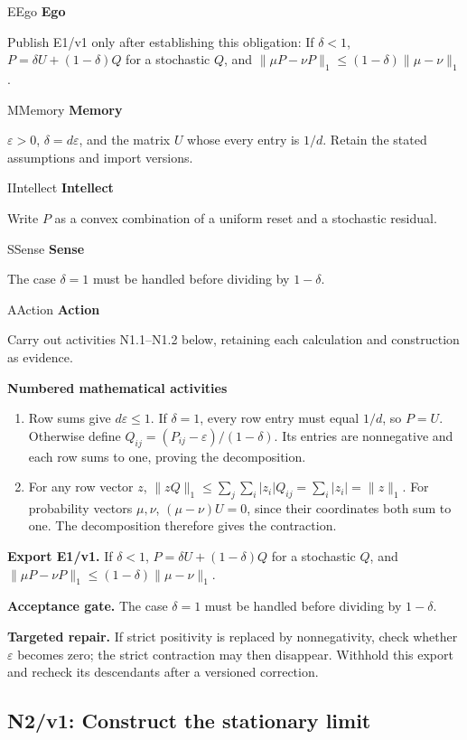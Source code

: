 \documentclass[preprint,12pt,aps,pra,showkeys,amsmath,amssymb,superscriptaddress,floatfix]{revtex4-2}
\theoremstyle{definition}
\theoremstyle{remark}
\newcommand{\mmfaculty}[3]{%
 \begin{mmfacultybox}{#1}{#2}
 {\sffamily\bfseries\color{MMBlue}#2}\par\smallskip #3
 \end{mmfacultybox}}
\newcommand{\field}[2]{\par\smallskip\noindent\textbf{#1.} #2\par}
\begin{document}
\mmfaculty{E}{Ego}{Publish E1/v1 only after establishing this obligation: If \(\delta<1\),
\(P=\delta U+(1-\delta)Q\) for a stochastic \(Q\), and
\(\|\mu P-\nu P\|_1\le(1-\delta)\|\mu-\nu\|_1\).}

\mmfaculty{M}{Memory}{\(\varepsilon>0\), \(\delta=d\varepsilon\), and the matrix \(U\) whose
every entry is \(1/d\). Retain the stated assumptions and import
versions.}

\mmfaculty{I}{Intellect}{Write \(P\) as a convex combination of a uniform reset and a stochastic
residual.}

\mmfaculty{S}{Sense}{The case \(\delta=1\) must be handled before dividing by \(1-\delta\).}

\mmfaculty{A}{Action}{Carry out activities N1.1--N1.2 below, retaining each calculation and
construction as evidence.}

\smallskip\noindent\textbf{Numbered mathematical activities}

\begin{enumerate}[label=N1.\arabic*,leftmargin=3.4em]

\item Row sums give \(d\varepsilon\le1\). If \(\delta=1\), every row entry
must equal \(1/d\), so \(P=U\). Otherwise define
\(Q_{ij}=(P_{ij}-\varepsilon)/(1-\delta)\). Its entries are nonnegative
and each row sums to one, proving the decomposition.

\item For any row vector \(z\),
\(\|zQ\|_1\le\sum_j\sum_i|z_i|Q_{ij}=\sum_i|z_i|=\|z\|_1\). For
probability vectors \(\mu,\nu\), \((\mu-\nu)U=0\), since their
coordinates both sum to one. The decomposition therefore gives the
contraction.

\end{enumerate}

\field{Export E1/v1}{If \(\delta<1\), \(P=\delta U+(1-\delta)Q\) for a stochastic \(Q\), and
\(\|\mu P-\nu P\|_1\le(1-\delta)\|\mu-\nu\|_1\).}

\field{Acceptance gate}{The case \(\delta=1\) must be handled before dividing by \(1-\delta\).}

\field{Targeted repair}{If strict positivity is replaced by nonnegativity, check whether
\(\varepsilon\) becomes zero; the strict contraction may then disappear.
Withhold this export and recheck its descendants after a versioned
correction.}

\clearpage

\subsection{N2/v1: Construct the stationary limit}
\end{document}
